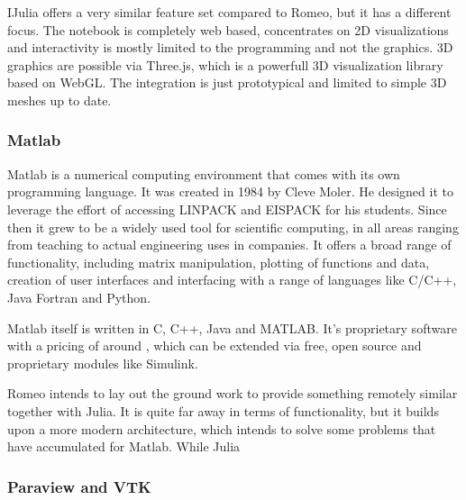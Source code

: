 IJulia offers a very similar feature set compared to Romeo, but it has a different focus.
The notebook is completely web based, concentrates on 2D visualizations and interactivity is mostly limited to the programming and not the graphics.
3D graphics are possible via Three.js, which is a powerfull 3D visualization library based on WebGL.
The integration is just prototypical and limited to simple 3D meshes up to date.


\subsubsection{Matlab}

\ac{Matlab} is a numerical computing environment that comes with its own programming language.
It was created in 1984 by Cleve Moler. He designed it to leverage the effort of accessing LINPACK and EISPACK for his students.
Since then it grew to be a widely used tool for scientific computing, in all areas ranging from teaching to actual engineering uses in companies.
It offers a broad range of functionality, including matrix manipulation, plotting of functions and data, creation of user interfaces and interfacing with a range of languages like C/C++, Java Fortran and Python.

\ac{Matlab} itself is written in C, C++, Java and MATLAB.
It's proprietary software with a pricing of around  \cite{MatlabPricing}, which can be extended via free, open source and proprietary modules like Simulink.

Romeo intends to lay out the ground work to provide something remotely similar together with Julia. It is quite far away in terms of functionality, but it builds upon a more modern architecture, which intends to solve some problems that have accumulated for Matlab.
While Julia 

\subsubsection{Paraview and VTK}

